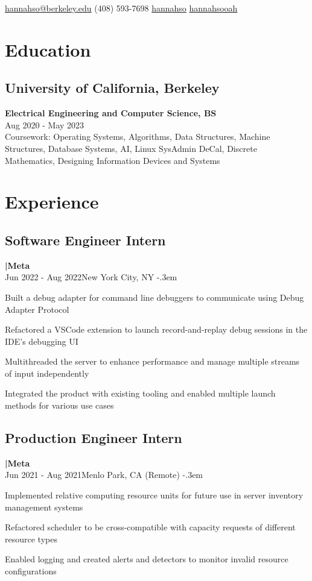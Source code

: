 \documentclass{article}
\makeatletter
\def\faEmail{{\FAFR \symbol{"F0E0}}} %
\def\faPhone{{\FAFR \symbol{"F095}}} %
\def\faLinkedin{{\FAB \symbol{"F08C}}} %
\def\faGithub{{\FAB \symbol{"F09B}}} %
\let\olditemize=\itemize \let\endolditemize=\enditemize
\renewenvironment{itemize}{\olditemize[topsep=0em] \itemsep-.3em}{\endolditemize}
\newcommand{\entry}[3]{\quad\textbf{|\quad#1}\\#2\qquad#3}
\renewcommand{\maketitle}{
  \begin{flushleft}
    \Huge\bfseries\theauthor
  \end{flushleft}
  \begin{bfseries}
    \faEmail    \hspace{1pt} \href{mailto:hannahso@berkeley.edu}{hannahso@berkeley.edu} \quad
    \faPhone    \hspace{1pt} (408) 593-7698 \quad
    \faLinkedin \hspace{1pt} \href{https://www.linkedin.com/in/hannahso}{hannahso} \quad
    \faGithub   \hspace{1pt} \href{https://github.com/hannahsooah/}{hannahsooah}
  \end{bfseries}
}
\makeatother
\begin{document}
\author{\color{titlecolor}Hannah S. Oh}
\maketitle


\section{Education}
\subsection{University of California, Berkeley}\quad\textbf{Electrical Engineering and Computer Science, BS}\\
{Aug 2020 - May 2023}\\
Coursework:
  Operating Systems,
  Algorithms,
  Data Structures,
  Machine Structures,
  Database Systems,
  AI, 
  Linux SysAdmin DeCal,
  Discrete Mathematics,
  Designing Information Devices and Systems


\section{Experience}

\subsection{Software Engineer Intern}
\entry{Meta}{Jun 2022 - Aug 2022}{New York City, NY}
\begin{itemize}
  \item Built a debug adapter for command line debuggers to communicate using Debug Adapter Protocol
  \item Refactored a VSCode extension to launch record-and-replay debug sessions in the IDE's debugging UI
  \item Multithreaded the server to enhance performance and manage multiple streams of input independently
  \item Integrated the product with existing tooling and enabled multiple launch methods for various use cases
\end{itemize}

\subsection{Production Engineer Intern}
\entry{Meta}{Jun 2021 - Aug 2021}{Menlo Park, CA (Remote)}
\begin{itemize}
  \item Implemented relative computing resource units for future use in server inventory management systems
  \item Refactored scheduler to be cross-compatible with capacity requests of different resource types
  \item Enabled logging and created alerts and detectors to monitor invalid resource configurations
\end{itemize}
\end{document}
